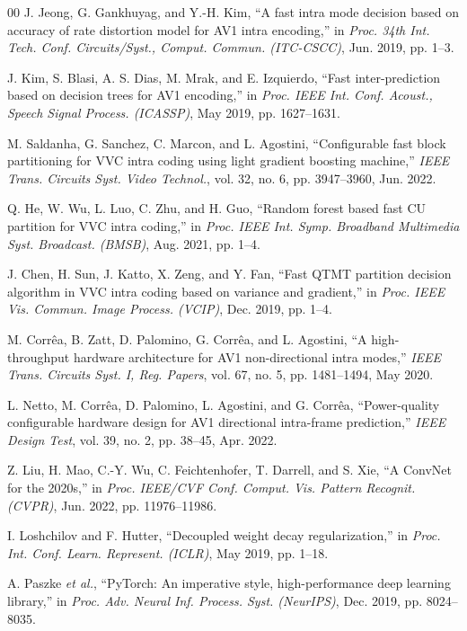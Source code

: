 \documentclass[conference]{IEEEtran}
\begin{document}
\begin{thebibliography}{00}
 J. Jeong, G. Gankhuyag, and Y.-H. Kim, ``A fast intra mode decision based on accuracy of rate distortion model for AV1 intra encoding,'' in \emph{Proc. 34th Int. Tech. Conf. Circuits/Syst., Comput. Commun. (ITC-CSCC)}, Jun. 2019, pp. 1--3.

 J. Kim, S. Blasi, A. S. Dias, M. Mrak, and E. Izquierdo, ``Fast inter-prediction based on decision trees for AV1 encoding,'' in \emph{Proc. IEEE Int. Conf. Acoust., Speech Signal Process. (ICASSP)}, May 2019, pp. 1627--1631.

 M. Saldanha, G. Sanchez, C. Marcon, and L. Agostini, ``Configurable fast block partitioning for VVC intra coding using light gradient boosting machine,'' \emph{IEEE Trans. Circuits Syst. Video Technol.}, vol. 32, no. 6, pp. 3947--3960, Jun. 2022.

 Q. He, W. Wu, L. Luo, C. Zhu, and H. Guo, ``Random forest based fast CU partition for VVC intra coding,'' in \emph{Proc. IEEE Int. Symp. Broadband Multimedia Syst. Broadcast. (BMSB)}, Aug. 2021, pp. 1--4.

 J. Chen, H. Sun, J. Katto, X. Zeng, and Y. Fan, ``Fast QTMT partition decision algorithm in VVC intra coding based on variance and gradient,'' in \emph{Proc. IEEE Vis. Commun. Image Process. (VCIP)}, Dec. 2019, pp. 1--4.

 M. Corr\^ea, B. Zatt, D. Palomino, G. Corr\^ea, and L. Agostini, ``A high-throughput hardware architecture for AV1 non-directional intra modes,'' \emph{IEEE Trans. Circuits Syst. I, Reg. Papers}, vol. 67, no. 5, pp. 1481--1494, May 2020.

 L. Netto, M. Corr\^ea, D. Palomino, L. Agostini, and G. Corr\^ea, ``Power-quality configurable hardware design for AV1 directional intra-frame prediction,'' \emph{IEEE Design Test}, vol. 39, no. 2, pp. 38--45, Apr. 2022.

 Z. Liu, H. Mao, C.-Y. Wu, C. Feichtenhofer, T. Darrell, and S. Xie, ``A ConvNet for the 2020s,'' in \emph{Proc. IEEE/CVF Conf. Comput. Vis. Pattern Recognit. (CVPR)}, Jun. 2022, pp. 11976--11986.

 I. Loshchilov and F. Hutter, ``Decoupled weight decay regularization,'' in \emph{Proc. Int. Conf. Learn. Represent. (ICLR)}, May 2019, pp. 1--18.

 A. Paszke \emph{et al.}, ``PyTorch: An imperative style, high-performance deep learning library,'' in \emph{Proc. Adv. Neural Inf. Process. Syst. (NeurIPS)}, Dec. 2019, pp. 8024--8035.


\end{thebibliography}
\end{document}

